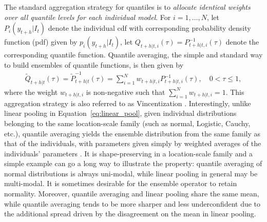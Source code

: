 \documentclass[11pt]{article}
\begin{document}
The standard aggregation strategy for quantiles is to \textit{allocate identical weights over all quantile levels for each individual model}. For $i=1,\ldots,N$, let $P_{i}(y_{t+h}|I_{t})$ denote the individual cdf with corresponding probability density function (pdf) given by $p_{i}(y_{t+h}|I_{t})$, let $Q_{t+h|t,i}(\tau) = P_{t+h|t,i}^{-1}(\tau)$ denote the corresponding quantile function. Quantile averaging, the simple and standard way to build ensembles of quantile functions, is then given by
\begin{align}
\label{eq:quantile_avg}
\tilde{Q}_{t+h|t}(\tau) = \tilde{P}_{t+h|t}^{-1}(\tau) = \sum_{i=1}^{N} w_{t+h|t,i} P_{t+h|t,i}^{-1}(\tau), \quad 0 < \tau \leq 1,
\end{align}
where the weight $w_{t+h|t,i}$ is non-negative such that $\sum_{i=1}^{N}w_{t+h|t,i}=1$. This aggregation strategy is also referred to as Vincentization \citep{vincent1912-fu}. Interestingly, unlike linear pooling in Equation~\eqref{eq:linear_pool}, given individual distributions belonging to the same location-scale family (such as normal, Logistic, Cauchy, etc.), quantile averaging yields the ensemble distribution from the same family as that of the individuals, with parameters given simply by weighted averages of the individuals' parameters \citep{Ratcliff1979-cb,Thomas1980-lp}. It is shape-preserving in a location-scale family and a simple example can go a long way to illustrate the property: quantile averaging of normal distributions is always uni-modal, while linear pooling in general may be multi-modal. It is sometimes desirable for the ensemble operator to retain normality. Moreover, quantile averaging and linear pooling share the same mean, while quantile averaging tends to be more sharper and less underconfident due to the additional spread driven by the disagreement on the mean in linear pooling.
\end{document}
